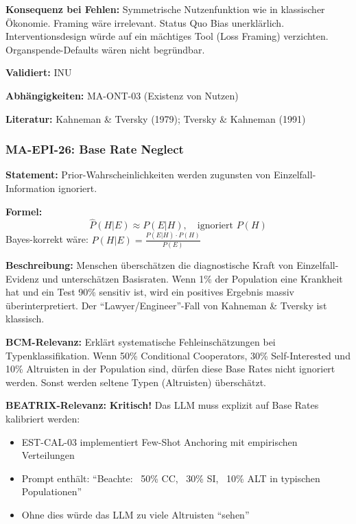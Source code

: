 \textbf{Konsequenz bei Fehlen:}
Symmetrische Nutzenfunktion wie in klassischer Ökonomie. Framing wäre irrelevant. Status Quo Bias unerklärlich. Interventionsdesign würde auf ein mächtiges Tool (Loss Framing) verzichten. Organspende-Defaults wären nicht begründbar.

\textbf{Validiert:} INU

\textbf{Abhängigkeiten:} MA-ONT-03 (Existenz von Nutzen)

\textbf{Literatur:} Kahneman \& Tversky (1979); Tversky \& Kahneman (1991)


\subsubsection*{MA-EPI-26: Base Rate Neglect}

\textbf{Statement:} Prior-Wahrscheinlichkeiten werden zugunsten von Einzelfall-Information ignoriert.

\textbf{Formel:}
\begin{equation}
\hat{P}(H|E) \approx P(E|H), \quad \text{ignoriert } P(H)
\end{equation}
Bayes-korrekt wäre: $P(H|E) = \frac{P(E|H) \cdot P(H)}{P(E)}$

\textbf{Beschreibung:}
Menschen überschätzen die diagnostische Kraft von Einzelfall-Evidenz und unterschätzen Basisraten. Wenn 1\% der Population eine Krankheit hat und ein Test 90\% sensitiv ist, wird ein positives Ergebnis massiv überinterpretiert. Der ``Lawyer/Engineer''-Fall von Kahneman \& Tversky ist klassisch.

\textbf{BCM-Relevanz:}
Erklärt systematische Fehleinschätzungen bei Typenklassifikation. Wenn 50\% Conditional Cooperators, 30\% Self-Interested und 10\% Altruisten in der Population sind, dürfen diese Base Rates nicht ignoriert werden. Sonst werden seltene Typen (Altruisten) überschätzt.

\textbf{BEATRIX-Relevanz:}
\textbf{Kritisch!} Das LLM muss explizit auf Base Rates kalibriert werden:
\begin{itemize}
    \item EST-CAL-03 implementiert Few-Shot Anchoring mit empirischen Verteilungen
    \item Prompt enthält: ``Beachte: ~50\% CC, ~30\% SI, ~10\% ALT in typischen Populationen''
    \item Ohne dies würde das LLM zu viele Altruisten ``sehen''
\end{itemize}

